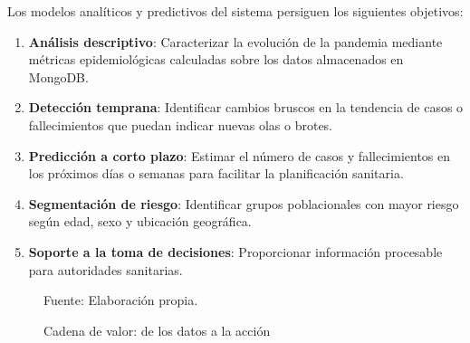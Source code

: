 \documentclass[12pt,a4paper]{article}
\renewcommand{\footnotesize}{\fontsize{10pt}{12pt}\selectfont}
\begin{document}
Los modelos analíticos y predictivos del sistema persiguen los siguientes objetivos:

\begin{enumerate}
    \item \textbf{Análisis descriptivo}: Caracterizar la evolución de la pandemia mediante métricas epidemiológicas calculadas sobre los datos almacenados en MongoDB.
    \item \textbf{Detección temprana}: Identificar cambios bruscos en la tendencia de casos o fallecimientos que puedan indicar nuevas olas o brotes.
    \item \textbf{Predicción a corto plazo}: Estimar el número de casos y fallecimientos en los próximos días o semanas para facilitar la planificación sanitaria.
    \item \textbf{Segmentación de riesgo}: Identificar grupos poblacionales con mayor riesgo según edad, sexo y ubicación geográfica.
    \item \textbf{Soporte a la toma de decisiones}: Proporcionar información procesable para autoridades sanitarias.
\end{enumerate}

\begin{figure}[H]
    \centering
    \caption{Cadena de valor: de los datos a la acción}
    {\footnotesize Fuente: Elaboración propia.}
\end{figure}
\end{document}
